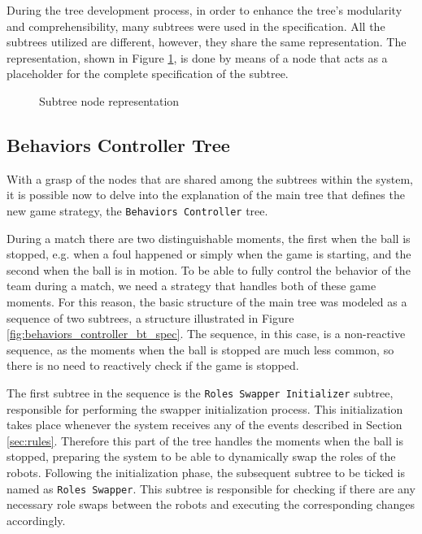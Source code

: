 During the tree development process, in order to enhance the tree's modularity and comprehensibility, many subtrees were used in the specification. All the subtrees utilized are different, however, they share the same representation. The representation, shown in Figure \ref{fig:subtrees_spec}, is done by means of a node that acts as a placeholder for the complete specification of the subtree.

\begin{figure}[!h]
    \centering
    \scalebox{1.} {
        \begin{forest}
        \end{forest}
    }
    \caption{Subtree node representation}
    \label{fig:subtrees_spec}
\end{figure}

\subsection{Behaviors Controller Tree}

With a grasp of the nodes that are shared among the subtrees within the system, it is possible now to delve into the explanation of the main tree that defines the new game strategy, the \texttt{Behaviors Controller} tree.

During a match there are two distinguishable moments, the first when the ball is stopped, e.g. when a foul happened or simply when the game is starting, and the second when the ball is in motion. To be able to fully control the behavior of the team during a match, we need a strategy that handles both of these game moments. For this reason, the basic structure of the main tree was modeled as a sequence of two subtrees, a structure illustrated in Figure \ref{fig:behaviors_controller_bt_spec}. The sequence, in this case, is a non-reactive sequence, as the moments when the ball is stopped are much less common, so there is no need to reactively check if the game is stopped.

The first subtree in the sequence is the \texttt{Roles Swapper Initializer} subtree, responsible for performing the swapper initialization process. This initialization takes place whenever the system receives any of the events described in Section \ref{sec:rules}. Therefore this part of the tree handles the moments when the ball is stopped, preparing the system to be able to dynamically swap the roles of the robots. Following the initialization phase, the subsequent subtree to be ticked is named as \texttt{Roles Swapper}. This subtree is responsible for checking if there are any necessary role swaps between the robots and executing the corresponding changes accordingly.

